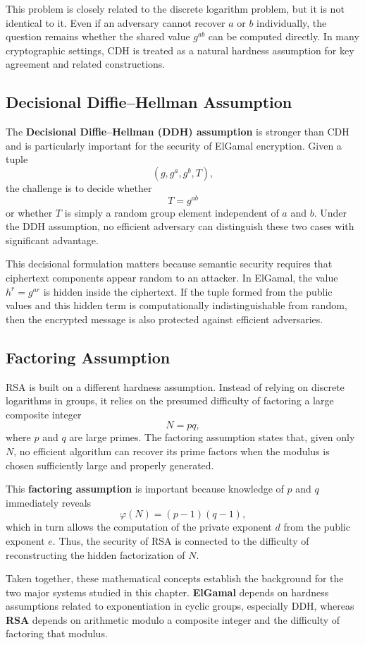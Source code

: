 This problem is closely related to the discrete logarithm problem, but it is not identical to it. Even if an adversary cannot recover $a$ or $b$ individually, the question remains whether the shared value $g^{ab}$ can be computed directly. In many cryptographic settings, CDH is treated as a natural hardness assumption for key agreement and related constructions.

\subsection{Decisional Diffie--Hellman Assumption}

The \textbf{Decisional Diffie--Hellman (DDH) assumption} is stronger than CDH and is particularly important for the security of ElGamal encryption. Given a tuple
\[
(g, g^a, g^b, T),
\]
the challenge is to decide whether
\[
T = g^{ab}
\]
or whether $T$ is simply a random group element independent of $a$ and $b$. Under the DDH assumption, no efficient adversary can distinguish these two cases with significant advantage.

This decisional formulation matters because semantic security requires that ciphertext components appear random to an attacker. In ElGamal, the value $h^r = g^{ar}$ is hidden inside the ciphertext. If the tuple formed from the public values and this hidden term is computationally indistinguishable from random, then the encrypted message is also protected against efficient adversaries.

\subsection{Factoring Assumption}

RSA is built on a different hardness assumption. Instead of relying on discrete logarithms in groups, it relies on the presumed difficulty of factoring a large composite integer
\[
N = pq,
\]
where $p$ and $q$ are large primes. The factoring assumption states that, given only $N$, no efficient algorithm can recover its prime factors when the modulus is chosen sufficiently large and properly generated.

This \textbf{factoring assumption} is important because knowledge of $p$ and $q$ immediately reveals
\[
\varphi(N) = (p-1)(q-1),
\]
which in turn allows the computation of the private exponent $d$ from the public exponent $e$. Thus, the security of RSA is connected to the difficulty of reconstructing the hidden factorization of $N$.

Taken together, these mathematical concepts establish the background for the two major systems studied in this chapter. \textbf{ElGamal} depends on hardness assumptions related to exponentiation in cyclic groups, especially DDH, whereas \textbf{RSA} depends on arithmetic modulo a composite integer and the difficulty of factoring that modulus.
